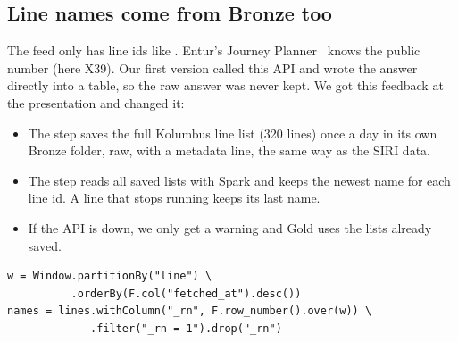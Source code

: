\subsection*{Line names come from Bronze too}

The feed only has line ids like . Entur's Journey Planner~\cite{jp}
knows the public number (here X39). Our first version called this API and wrote the answer
directly into a table, so the raw answer was never kept. We got this feedback at the
presentation and changed it:
\begin{itemize}
  \item The step  saves the full Kolumbus line list (320 lines) once a day in
        its own Bronze folder, raw, with a metadata line, the same way as the SIRI data.
  \item The step  reads all saved lists with Spark and keeps the newest name for
        each line id. A line that stops running keeps its last name.
  \item If the API is down, we only get a warning and Gold uses the lists already saved.
\end{itemize}

\begin{lstlisting}
w = Window.partitionBy("line") \
          .orderBy(F.col("fetched_at").desc())
names = lines.withColumn("_rn", F.row_number().over(w)) \
             .filter("_rn = 1").drop("_rn")
\end{lstlisting}

